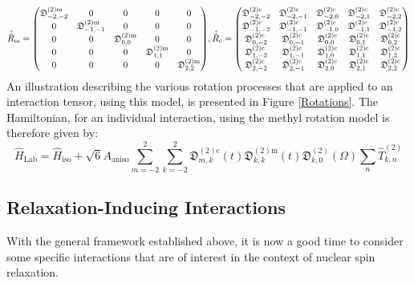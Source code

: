 \begin{equation}
\hat{\hat{R}}_{\text{m}} = \mqty(\mathfrak{D}_{-2,-2}^{(2) \text{m}} & 0 & 0 & 0 & 0 \\ 0 & \mathfrak{D}_{-1,-1}^{(2) \text{m}} & 0 & 0 & 0 \\ 0 & 0 & \mathfrak{D}_{0,0}^{(2) \text{m}} & 0 & 0 \\ 0 & 0 & 0 & \mathfrak{D}_{1,1}^{(2) \text{m}} & 0 \\ 0 & 0 & 0 & 0 & \mathfrak{D}_{2,2}^{(2) \text{m}}),
\hat{\hat{R}}_{\text{c}} = \mqty(\mathfrak{D}_{-2,-2}^{(2) \text{c}} & \mathfrak{D}_{-2,-1}^{(2) \text{c}} & \mathfrak{D}_{-2,0}^{(2) \text{c}} & \mathfrak{D}_{-2,1}^{(2) \text{c}} & \mathfrak{D}_{-2,2}^{(2) \text{c}} \\ \mathfrak{D}_{-1,-2}^{(2) \text{c}} & \mathfrak{D}_{-1,-1}^{(2) \text{c}} & \mathfrak{D}_{-1,0}^{(2) \text{c}} & \mathfrak{D}_{-1,1}^{(2) \text{c}} & \mathfrak{D}_{-1,2}^{(2) \text{c}} \\ \mathfrak{D}_{0,-2}^{(2) \text{c}} & \mathfrak{D}_{0,-1}^{(2) \text{c}} & \mathfrak{D}_{0,0}^{(2) \text{c}} & \mathfrak{D}_{0,1}^{(2) \text{c}} & \mathfrak{D}_{0,2}^{(2) \text{c}} \\ \mathfrak{D}_{1,-2}^{(2) \text{c}} & \mathfrak{D}_{1,-1}^{(2) \text{c}} & \mathfrak{D}_{1,0}^{(2) \text{c}} & \mathfrak{D}_{1,1}^{(2) \text{c}} & \mathfrak{D}_{1,2}^{(2) \text{c}} \\ \mathfrak{D}_{2,-2}^{(2) \text{c}} & \mathfrak{D}_{2,-1}^{(2) \text{c}} & \mathfrak{D}_{2,0}^{(2) \text{c}} & \mathfrak{D}_{2,1}^{(2) \text{c}} & \mathfrak{D}_{2,2}^{(2) \text{c}}) 
\end{equation}
\normalsize
An illustration describing the various rotation processes that are applied to an interaction tensor, using this model, is presented in Figure \ref{Rotations}. The Hamiltonian, for an individual interaction, using the methyl rotation model is therefore given by:
\begin{equation}
\label{MethylHam}
\hat{H}_{\text{Lab}} = \hat{H}_{\text{iso}} + \sqrt{6} A_{\text{aniso}} \sum \limits_{m = -2}^2 \sum \limits_{k = -2}^2 \mathfrak{D}_{m,k}^{(2) \text{c}}(t) \mathfrak{D}_{k,k}^{(2) \text{m}}(t) \mathfrak{D}_{k,0}^{(2)}(\Omega) \sum \limits_n \hat{T}_{k,n}^{(2)}
\end{equation}
\subsection{Relaxation-Inducing Interactions}
With the general framework established above, it is now a good time to consider some specific interactions that are of interest in the context of nuclear spin relaxation.
